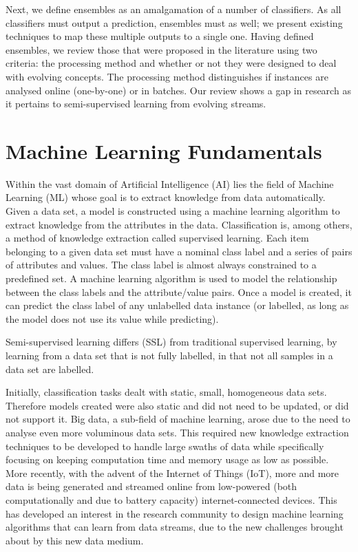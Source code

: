 Next, we define ensembles as an amalgamation of a number of classifiers. As all classifiers must output a prediction, ensembles must as well; we present existing techniques to map these multiple outputs to a single one. Having defined ensembles, we review those that were proposed in the literature using two criteria: the processing method and whether or not they were designed to deal with evolving concepts. The processing method distinguishes if instances are analysed online (one-by-one) or in batches. Our review shows a gap in research as it pertains to semi-supervised learning from evolving streams.

\section{Machine Learning Fundamentals}
Within the vast domain of Artificial Intelligence (AI) lies the field of Machine Learning (ML) whose goal is to extract knowledge from data automatically. Given a data set, a model is constructed using a machine learning algorithm to extract knowledge from the attributes in the data. 
Classification is, among others, a method of knowledge extraction called supervised learning. Each item belonging to a given data set must have a nominal class label and a series of pairs of attributes and values. The class label is almost always constrained to a predefined set. A machine learning algorithm is used to model the relationship between the class labels and the attribute/value pairs. Once a model is created, it can predict the class label of any unlabelled data instance (or labelled, as long as the model does not use its value while predicting).

Semi-supervised learning differs (SSL) from traditional supervised learning, by learning from a data set that is not fully labelled, in that not all samples in a data set are labelled.

Initially, classification tasks dealt with static, small, homogeneous data sets. Therefore models created were also static and did not need to be updated, or did not support it. 
Big data, a sub-field of machine learning, arose due to the need to analyse even more voluminous data sets. This required new knowledge extraction techniques to be developed to handle large swaths of data while specifically focusing on keeping computation time and memory usage as low as possible.
More recently, with the advent of the Internet of Things (IoT), more and more data is being generated and streamed online from low-powered (both computationally and due to battery capacity) internet-connected devices. This has developed an interest in the research community to design machine learning algorithms that can learn from data streams, due to the new challenges brought about by this new data medium.

